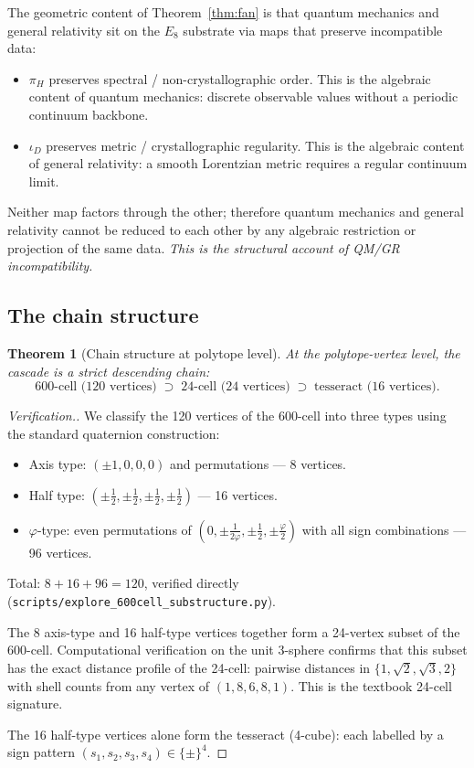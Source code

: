 \documentclass[12pt]{article}
\newtheorem{theorem}{Theorem}
\begin{document}
The geometric content of Theorem~\ref{thm:fan} is that quantum mechanics and general relativity sit on the $E_8$ substrate via maps that preserve incompatible data:
\begin{itemize}
    \item $\pi_H$ preserves spectral / non-crystallographic order. This is the algebraic content of quantum mechanics: discrete observable values without a periodic continuum backbone.
    \item $\iota_D$ preserves metric / crystallographic regularity. This is the algebraic content of general relativity: a smooth Lorentzian metric requires a regular continuum limit.
\end{itemize}
Neither map factors through the other; therefore quantum mechanics and general relativity cannot be reduced to each other by any algebraic restriction or projection of the same data. \emph{This is the structural account of QM/GR incompatibility.}

\subsection{The chain structure}\label{sec:emb:chain}

\begin{theorem}[Chain structure at polytope level]\label{thm:chain}
At the polytope-vertex level, the cascade is a strict descending chain:
\[
\text{600-cell (120 vertices)} \;\supset\; \text{24-cell (24 vertices)} \;\supset\; \text{tesseract (16 vertices)}.
\]
\end{theorem}

\begin{proof}[Verification.]
We classify the 120 vertices of the 600-cell into three types using the standard quaternion construction:
\begin{itemize}
    \item Axis type: $(\pm 1, 0, 0, 0)$ and permutations --- 8 vertices.
    \item Half type: $(\pm \tfrac{1}{2}, \pm \tfrac{1}{2}, \pm \tfrac{1}{2}, \pm \tfrac{1}{2})$ --- 16 vertices.
    \item $\varphi$-type: even permutations of $(0, \pm \tfrac{1}{2\varphi}, \pm \tfrac{1}{2}, \pm \tfrac{\varphi}{2})$ with all sign combinations --- 96 vertices.
\end{itemize}
Total: $8 + 16 + 96 = 120$, verified directly (\texttt{scripts/explore\_600cell\_substructure.py}).

The 8 axis-type and 16 half-type vertices together form a 24-vertex subset of the 600-cell. Computational verification on the unit 3-sphere confirms that this subset has the exact distance profile of the 24-cell: pairwise distances in $\{1, \sqrt{2}, \sqrt{3}, 2\}$ with shell counts from any vertex of $(1, 8, 6, 8, 1)$. This is the textbook 24-cell signature.

The 16 half-type vertices alone form the tesseract (4-cube): each labelled by a sign pattern $(s_1, s_2, s_3, s_4) \in \{\pm\}^4$.
\end{proof}
\end{document}

